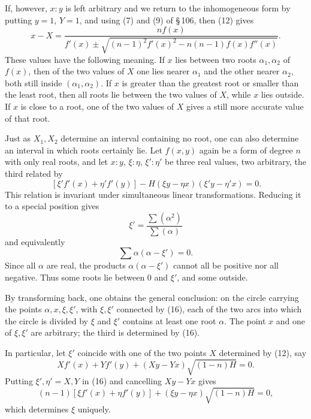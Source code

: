 \documentclass[11pt]{article}
\begin{document}
If, however, $x:y$ is left arbitrary and we return to the inhomogeneous form by putting $y=1$, $Y=1$, and using (7) and (9) of \S\,106, then (12) gives
\begin{equation}
        x-X=\frac{n f(x)}
        {f'(x)\pm\sqrt{(n-1)^2f'(x)^2-n(n-1)f(x)f''(x)}}.
\tag{15}
\end{equation}
These values have the following meaning. If $x$ lies between two roots $\alpha_1,\alpha_2$ of $f(x)$, then of the two values of $X$ one lies nearer $\alpha_1$ and the other nearer $\alpha_2$, both still inside $(\alpha_1,\alpha_2)$. If $x$ is greater than the greatest root or smaller than the least root, then all roots lie between the two values of $X$, while $x$ lies outside. If $x$ is close to a root, one of the two values of $X$ gives a still more accurate value of that root.

Just as $X_1,X_2$ determine an interval containing no root, one can also determine an interval in which roots certainly lie. Let $f(x,y)$ again be a form of degree $n$ with only real roots, and let $x:y$, $\xi:\eta$, $\xi':\eta'$ be three real values, two arbitrary, the third related by
\begin{equation}
[\xi f'(x)+\eta f'(y)]\,[\xi' f'(x)+\eta'f'(y)]
-H(\xi y-\eta x)(\xi'y-\eta'x)=0.
\tag{16}
\end{equation}
This relation is invariant under simultaneous linear transformations. Reducing it to a special position gives
\[
        \xi'=\frac{\sum(\alpha^2)}{\sum(\alpha)}
\]
and equivalently
\[
        \sum\alpha(\alpha-\xi')=0.
\]
Since all $\alpha$ are real, the products $\alpha(\alpha-\xi')$ cannot all be positive nor all negative. Thus some roots lie between $0$ and $\xi'$, and some outside.

By transforming back, one obtains the general conclusion: on the circle carrying the points $\alpha,x,\xi,\xi'$, with $\xi,\xi'$ connected by (16), each of the two arcs into which the circle is divided by $\xi$ and $\xi'$ contains at least one root $\alpha$. The point $x$ and one of $\xi,\xi'$ are arbitrary; the third is determined by (16).

In particular, let $\xi'$ coincide with one of the two points $X$ determined by (12), say
\begin{equation}
        Xf'(x)+Yf'(y)+(Xy-Yx)\sqrt{(1-n)H}=0.
\tag{17}
\end{equation}
Putting $\xi',\eta'=X,Y$ in (16) and cancelling $Xy-Yx$ gives
\begin{equation}
        (n-1)[\xi f'(x)+\eta f'(y)]+(\xi y-\eta x)\sqrt{(1-n)H}=0,
\tag{18}
\end{equation}
which determines $\xi$ uniquely.
\end{document}
